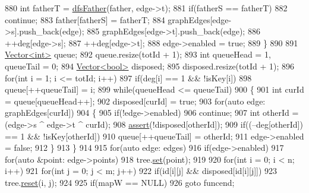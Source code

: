 \begin{DoxyCode}
880         \textcolor{keywordtype}{int} fatherT = \hyperlink{classColumnGenSolve_af3470aaed4b9d0aa92f27b487b093479}{dfsFather}(father, edge->t);
881         \textcolor{keywordflow}{if}(fatherS == fatherT)
882             \textcolor{keywordflow}{continue};
883         father[fatherS] = fatherT;
884         graphEdges[edge->s].push\_back(edge);
885         graphEdges[edge->t].push\_back(edge);
886         ++deg[edge->s];
887         ++deg[edge->t];
888         edge->enabled = \textcolor{keyword}{true};
889     \}
890     
891     \hyperlink{classVector}{Vector<int>} queue;
892     queue.resize(totId + 1);
893     \textcolor{keywordtype}{int} queueHead = 1, queueTail = 0;
894     \hyperlink{classVector}{Vector<bool>} disposed;
895     disposed.resize(totId + 1);
896     \textcolor{keywordflow}{for}(\textcolor{keywordtype}{int} i = 1; i <= totId; i++)
897         \textcolor{keywordflow}{if}(deg[i] == 1 && !isKey[i])
898             queue[++queueTail] = i;
899     \textcolor{keywordflow}{while}(queueHead <= queueTail)
900     \{
901         \textcolor{keywordtype}{int} curId = queue[queueHead++];
902         disposed[curId] = \textcolor{keyword}{true};
903         \textcolor{keywordflow}{for}(\textcolor{keyword}{auto} edge: graphEdges[curId])
904         \{
905             \textcolor{keywordflow}{if}(!edge->enabled)
906                 \textcolor{keywordflow}{continue};
907             \textcolor{keywordtype}{int} otherId = (edge->s ^ edge->t ^ curId);
908             \hyperlink{global_8h_af576bf8ffa22a44e53018c67095ffbf0}{assert}(!disposed[otherId]);
909             \textcolor{keywordflow}{if}((--deg[otherId]) == 1 && !isKey[otherId])
910                 queue[++queueTail] = otherId;
911             edge->enabled = \textcolor{keyword}{false};
912         \}
913     \}
914     
915     \textcolor{keywordflow}{for}(\textcolor{keyword}{auto} edge: edges)
916         \textcolor{keywordflow}{if}(edge->enabled)
917             \textcolor{keywordflow}{for}(\textcolor{keyword}{auto} &point: edge->points)
918                 tree.\hyperlink{classBitMatrix_ad26dd2e93e9d24d70834d6d79e29c81e}{set}(point);
919     
920     \textcolor{keywordflow}{for}(\textcolor{keywordtype}{int} i = 0; i < n; i++)
921         \textcolor{keywordflow}{for}(\textcolor{keywordtype}{int} j = 0; j < m; j++)
922             \textcolor{keywordflow}{if}(\textcolor{keywordtype}{id}[i][j] && disposed[\textcolor{keywordtype}{id}[i][j]])
923                 tree.\hyperlink{classBitMatrix_a0ee870454e6343c3272ab791e45af404}{reset}(i, j);
924     
925     \textcolor{keywordflow}{if}(mapW == NULL)
926         \textcolor{keywordflow}{goto} funcend;

\end{DoxyCode}
